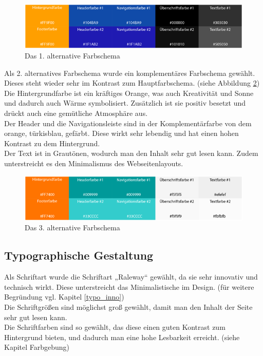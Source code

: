 \begin{figure} [hp]
\includegraphics[width=\textwidth]{./img/mini_farb2.png}
\caption{Das 1. alternative Farbschema }
\label{mini_farb2}
\end{figure}

Als 2. alternatives Farbschema wurde ein komplementäres Farbschema gewählt. Dieses steht wieder sehr im Kontrast zum Hauptfarbschema. (siehe Abbildung \ref{mini_farb3})
\\
Die Hintergrundfarbe ist ein kräftiges Orange, was auch Kreativität und Sonne und dadurch auch Wärme symbolisiert. Zusätzlich ist sie positiv besetzt und drückt auch eine gemütliche Atmosphäre aus.
\\
Der Header und die Navigationsleiste sind in der Komplementärfarbe von dem orange, türkisblau,  gefärbt. Diese wirkt sehr lebendig und hat einen hohen Kontrast zu dem Hintergrund.
\\
Der Text ist in Grautönen, wodurch man den Inhalt sehr gut lesen kann. Zudem unterstreicht es den Minimalismus des Webseitenlayouts.

\begin{figure} [hp]
\includegraphics[width=\textwidth]{./img/mini_farb3.png}
\caption{Das 3. alternative Farbschema }
\label{mini_farb3}
\end{figure}

	\subsection{Typographische Gestaltung}

Als Schriftart wurde die Schriftart „Raleway“ gewählt, da sie sehr innovativ und technisch wirkt. Diese unterstreicht das Minimalistische im Design. (für weitere Begründung vgl. Kapitel \ref{typo_inno})
\\
Die Schriftgrößen sind möglichst groß gewählt, damit man den Inhalt der Seite sehr gut lesen kann.
\\
Die Schriftfarben sind so gewählt, das diese einen guten Kontrast zum Hintergrund bieten, und dadurch man eine hohe Lesbarkeit erreicht. (siehe Kapitel Farbgebung)



